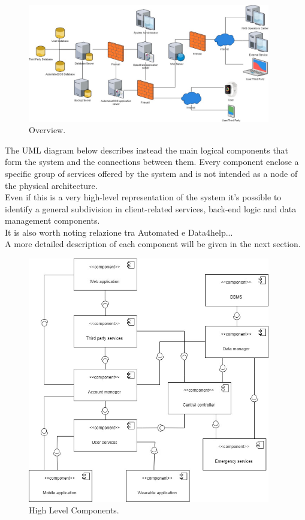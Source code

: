 \begin{figure}[ht]
    \centering
    \includegraphics[width=300pt]{images/Overview.jpg}
    \caption{Overview.}
\end{figure}

\clearpage
The UML diagram below describes instead the main logical components that form the system and the connections between them.
Every component enclose a specific group of services offered by the system and is not intended as a node of the physical architecture. \\
Even if this is a very high-level representation of the system it's possible to identify a general subdivision in client-related services, back-end logic and data management components. \\
It is also worth noting relazione tra Automated e Data4help...\\
A more detailed description of each component will be given in the next section. \\

\begin{figure}[ht]
    \centering
    \includegraphics[width=300pt]{images/High-Level_Components.jpg}
    \caption{High Level Components.}
    \label{HLC}
\end{figure}
\clearpage

